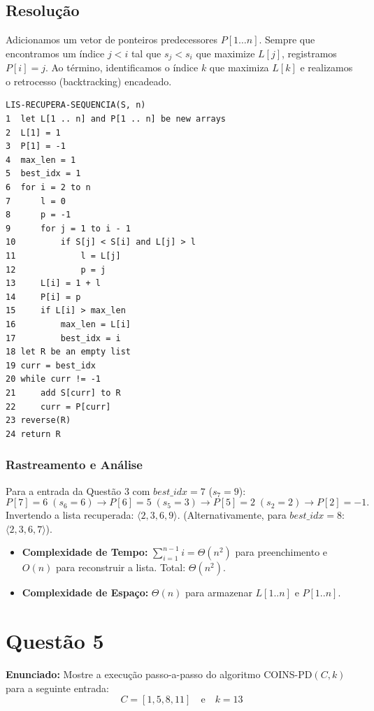 \documentclass[11pt,a4paper]{article}
\begin{document}
\subsection*{Resolução}

Adicionamos um vetor de ponteiros predecessores $P[1 \dots n]$. Sempre que encontramos um índice $j < i$ tal que $s_j < s_i$ que maximize $L[j]$, registramos $P[i] = j$. Ao término, identificamos o índice $k$ que maximiza $L[k]$ e realizamos o retrocesso (backtracking) encadeado.

\begin{lstlisting}
LIS-RECUPERA-SEQUENCIA(S, n)
1  let L[1 .. n] and P[1 .. n] be new arrays
2  L[1] = 1
3  P[1] = -1
4  max_len = 1
5  best_idx = 1
6  for i = 2 to n
7      l = 0
8      p = -1
9      for j = 1 to i - 1
10         if S[j] < S[i] and L[j] > l
11             l = L[j]
12             p = j
13     L[i] = 1 + l
14     P[i] = p
15     if L[i] > max_len
16         max_len = L[i]
17         best_idx = i
18 let R be an empty list
19 curr = best_idx
20 while curr != -1
21     add S[curr] to R
22     curr = P[curr]
23 reverse(R)
24 return R
\end{lstlisting}

\subsubsection*{Rastreamento e Análise}
Para a entrada da Questão 3 com $best\_idx = 7$ ($s_7 = 9$):
\[
P[7] = 6 \; (s_6 = 6) \to P[6] = 5 \; (s_5 = 3) \to P[5] = 2 \; (s_2 = 2) \to P[2] = -1.
\]
Invertendo a lista recuperada: $\langle 2, 3, 6, 9 \rangle$. (Alternativamente, para $best\_idx = 8$: $\langle 2, 3, 6, 7 \rangle$).
\begin{itemize}
    \item \textbf{Complexidade de Tempo:} $\sum_{i=1}^{n-1} i = \Theta(n^2)$ para preenchimento e $O(n)$ para reconstruir a lista. Total: $\Theta(n^2)$.
    \item \textbf{Complexidade de Espaço:} $\Theta(n)$ para armazenar $L[1..n]$ e $P[1..n]$.
\end{itemize}

\vspace{0.4cm}

\section*{Questão 5}
\textbf{Enunciado:} Mostre a execução passo-a-passo do algoritmo \textsc{COINS-PD}$(C, k)$ para a seguinte entrada:
\[
C = [1, 5, 8, 11] \quad \text{e} \quad k = 13
\]
\end{document}
